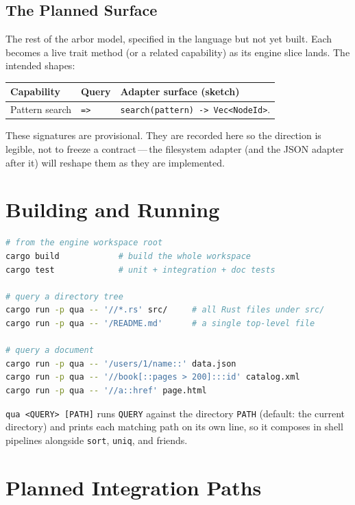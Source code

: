\documentclass{report}
\begin{document}
\section{The Planned Surface}\label{sec:planned}

The rest of the arbor model, specified in the language but not yet
built. Each becomes a live trait method (or a related capability) as
its engine slice lands. The intended shapes:

\begin{tabularx}{\textwidth}{l l X}
\toprule
\textbf{Capability} & \textbf{Query} & \textbf{Adapter surface (sketch)} \\
\midrule
Pattern search & \texttt{=>}
  & \texttt{search(pattern) -> Vec<NodeId>}. \\
\bottomrule
\end{tabularx}

\medskip

These signatures are provisional. They are recorded here so the
direction is legible, not to freeze a contract\,---\,the filesystem
adapter (and the JSON adapter after it) will reshape them as they are
implemented.


\chapter{Building and Running}

\begin{lstlisting}[language=bash]
# from the engine workspace root
cargo build            # build the whole workspace
cargo test             # unit + integration + doc tests

# query a directory tree
cargo run -p qua -- '//*.rs' src/     # all Rust files under src/
cargo run -p qua -- '/README.md'      # a single top-level file

# query a document
cargo run -p qua -- '/users/1/name::' data.json
cargo run -p qua -- '//book[::pages > 200]:::id' catalog.xml
cargo run -p qua -- '//a::href' page.html
\end{lstlisting}

\noindent
\texttt{qua <QUERY> [PATH]} runs \texttt{QUERY} against the directory
\texttt{PATH} (default: the current directory) and prints each
matching path on its own line, so it composes in shell pipelines
alongside \texttt{sort}, \texttt{uniq}, and friends.


\chapter{Planned Integration Paths}
\end{document}
